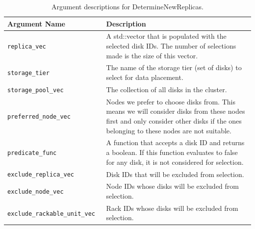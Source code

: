 \documentclass[12pt]{article}
\begin{document}
    \begin{table}[htbp]
      \caption{Argument descriptions for DetermineNewReplicas.}
      \begin{tabular}{ | p{0.4\linewidth} | p{0.6\linewidth} | }
        \hline
        \textbf{Argument Name} & \textbf{Description} \\ \hline
        \verb|replica_vec| & A std::vector that is populated with the selected
                             disk IDs. The number of selections made is the
                             size of this vector. \\ \hline

        \verb|storage_tier| & The name of the storage tier (set of disks) to
                              select for data placement. \\ \hline
 
        \verb|storage_pool_vec| & The collection of all disks in the cluster.  \\ \hline

        \verb|preferred_node_vec| & Nodes we prefer to choose disks from. This
                                    means we will consider disks from these
                                    nodes first and only consider other disks
                                    if the ones belonging to these nodes are
                                    not suitable. \\ \hline

        \verb|predicate_func| & A function that accepts a disk ID and returns a
                                boolean. If this function evaluates to false
                                for any disk, it is not considered for
                                selection. \\ \hline

        \verb|exclude_replica_vec| & Disk IDs that will be excluded from
                                     selection. \\ \hline

        \verb|exclude_node_vec| & Node IDs whose disks will be excluded from
                                  selection. \\ \hline

        \verb|exclude_rackable_unit_vec| & Rack IDs whose disks will be
                                           excluded from selection. \\ \hline

        \hline
      \end{tabular}
    \end{table}
\end{document}
